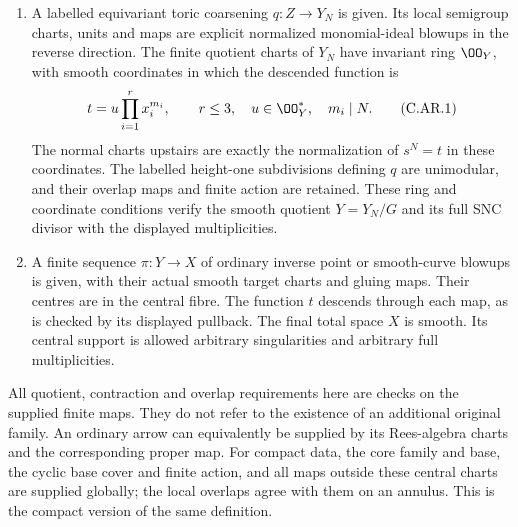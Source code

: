 \begin{enumerate}
\item A labelled equivariant toric coarsening
\(q:Z\to Y_N\) is given. Its local semigroup
charts, units and maps are explicit normalized
monomial-ideal blowups in the reverse direction.
The finite quotient charts of \(Y_N\) have
invariant ring \(\OO_Y\), with smooth coordinates
in which the descended function is
\[
                  t=u\prod_{i=1}^r x_i^{m_i},
              \qquad r\le3,\quad u\in\OO_Y^*,
              \quad m_i\mid N.
 \tag{C.AR.1}
\]
The normal charts upstairs are exactly the
normalization of \(s^N=t\) in these coordinates.
The labelled height-one subdivisions defining
\(q\) are unimodular, and their overlap maps
and finite action are retained. These ring and
coordinate conditions verify the smooth quotient
\(Y=Y_N/G\) and its full SNC divisor with
the displayed multiplicities.

\item A finite sequence \(\pi:Y\to X\) of
ordinary inverse point or smooth-curve blowups
is given, with their actual smooth target charts
and gluing maps. Their centres are in the central
fibre. The function \(t\) descends through each
map, as is checked by its displayed pullback.
The final total space \(X\) is smooth. Its
central support is allowed arbitrary singularities
and arbitrary full multiplicities.
\end{enumerate}
All quotient, contraction and overlap requirements here
are checks on the supplied finite maps. They do not
refer to the existence of an additional original family.
An ordinary arrow can equivalently be supplied by its
Rees-algebra charts and the corresponding proper map.
For compact data, the core family and base, the cyclic
base cover and finite action, and all maps outside these
central charts are supplied globally; the local overlaps
agree with them on an annulus. This is the compact
version of the same definition.


